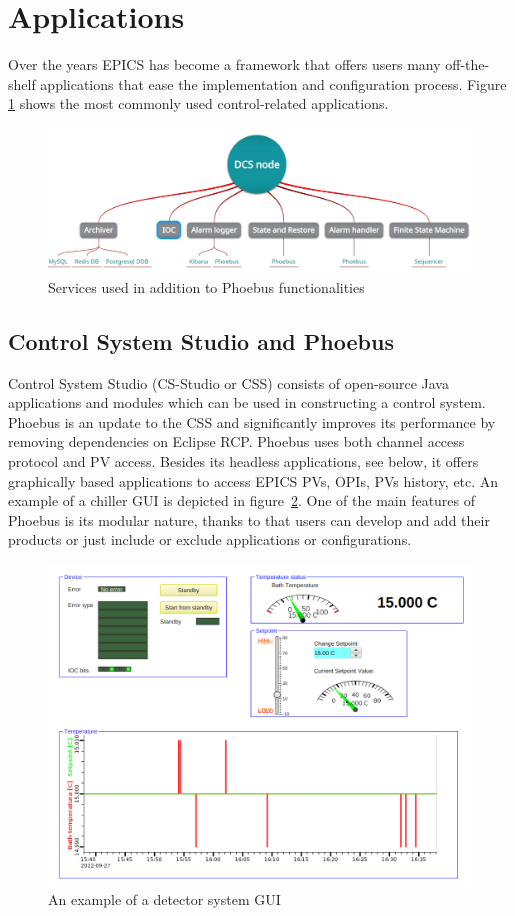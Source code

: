 \section{Applications}
Over the years EPICS has become a framework that offers users many off-the-shelf applications that ease the implementation and configuration process. Figure \ref{fig_dcs_node_msts} shows the most commonly used control-related applications. 

\begin{figure}[!h]
\centering
\includegraphics[width=0.95\columnwidth]{Chapter4/images/dcs_node.jpg}
\caption{Services used in addition to Phoebus functionalities}
\label{fig_dcs_node_msts}
\end{figure}
\subsection{Control System Studio and Phoebus}
Control System Studio (CS-Studio or CSS) consists of open-source Java applications and modules which can be used in constructing a control system. Phoebus is an update to the \gls{CSS} and significantly improves its performance by removing dependencies on Eclipse RCP. Phoebus uses both channel access protocol and PV access. Besides its headless applications, see below, it offers graphically based applications to access EPICS PVs, OPIs, PVs history, etc. An example of a chiller GUI is depicted in figure~\ref{fig_lauda1}. One of the main features of Phoebus is its modular nature, thanks to that users can develop and add their products or just include or exclude applications or configurations. 


\begin{figure}[!h]
\centering
\includegraphics[width=0.9\columnwidth]{Chapter4/images/lauda1.png}
\caption{An example of a detector system \gls{GUI}}
\label{fig_lauda1}
\end{figure}


